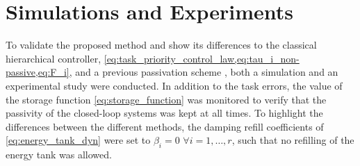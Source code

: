 \documentclass[../main.tex]{subfiles}
\begin{document}
\section{Simulations and Experiments}\label{sec:sim+exp}


To validate the proposed method and show its differences to the classical hierarchical controller, \cref{eq:task_priority_control_law,eq:tau_i_non-passive,eq:F_i}, and a previous passivation scheme \cite{dietrichPassiveHierarchicalImpedance2017}, both a simulation and an experimental study were conducted. In addition to the task errors, the value of the storage function \eqref{eq:storage_function} was monitored 
to verify that the passivity of the closed-loop systems was kept at all times.
To highlight the differences between the different methods, the damping refill coefficients of \eqref{eq:energy_tank_dyn} were set to $\beta_i = 0$ $\forall i = 1, \dots, r$, such that no refilling of the energy tank was allowed.
\end{document}
